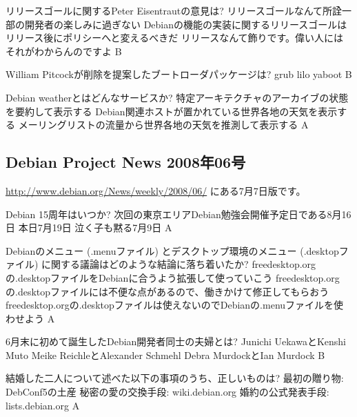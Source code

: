\documentclass[mingoth,a4paper]{jsarticle}
\begin{document}
\begin{multicols}{2}
 \santaku
 {リリースゴールに関するPeter Eisentrautの意見は?}
 {リリースゴールなんて所詮一部の開発者の楽しみに過ぎない}
 {Debianの機能の実装に関するリリースゴールはリリース後にポリシーへと変えるべきだ}
 {リリースなんて飾りです。偉い人にはそれがわからんのですよ}
 {B}
 
 \santaku
 {William Pitcockが削除を提案したブートローダパッケージは?}
 {grub}
 {lilo}
 {yaboot}
 {B}%
 
 \santaku
 {Debian weatherとはどんなサービスか?}
 {特定アーキテクチャのアーカイブの状態を要約して表示する}%
 {Debian関連ホストが置かれている世界各地の天気を表示する}%
 {メーリングリストの流量から世界各地の天気を推測して表示する}%
 {A}
 
 \subsection{Debian Project News 2008年06号}
 \url{http://www.debian.org/News/weekly/2008/06/}
 にある7月7日版です。
 
 \santaku
 {Debian 15周年はいつか?}
 {次回の東京エリアDebian勉強会開催予定日である8月16日}
 {本日7月19日}
 {泣く子も黙る7月9日}
 {A}
 
 \santaku
 {Debianのメニュー (.menuファイル) とデスクトップ環境のメニュー (.desktopファイル) に関する議論はどのような結論に落ち着いたか?}
 {freedesktop.orgの.desktopファイルをDebianに合うよう拡張して使っていこう}
 {freedesktop.orgの.desktopファイルには不便な点があるので、働きかけて修正してもらおう}
 {freedesktop.orgの.desktopファイルは使えないのでDebianの.menuファイルを使わせよう}
 {A}%
 
 \santaku
 {6月末に初めて誕生したDebian開発者同士の夫婦とは?}
 {Junichi UekawaとKenshi Muto}
 {Meike ReichleとAlexander Schmehl}
 {Debra MurdockとIan Murdock}%
 {B}
 
 \santaku
 {結婚した二人について述べた以下の事項のうち、正しいものは?}
 {最初の贈り物: DebConf5の土産}%
 {秘密の愛の交換手段: wiki.debian.org}%
 {婚約の公式発表手段: lists.debian.org}%
 {A}

\end{multicols}
\end{document}
